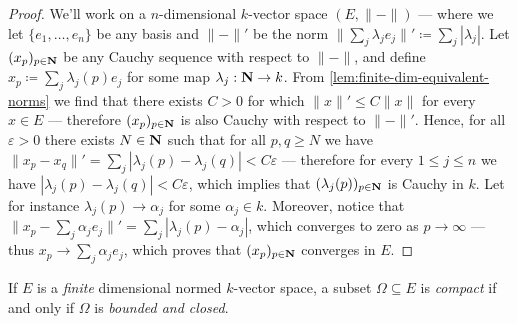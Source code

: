 \begin{proof}
    We'll work on a \(n\)-dimensional \(k\)-vector space \((E, \| - \|)\) --- where
    we let \(\{e_1, \dots, e_n\}\) be any basis and \(\| - \|'\) be the norm \(\|
    \sum_j \lambda_j e_j \|' \coloneq \sum_j |\lambda_j|\). Let \((x_p)_{p \in \mathbf{N}}\)
    be any Cauchy sequence with respect to \(\| - \|\), and define \(x_p \coloneq
    \sum_j \lambda_j(p) e_j\) for some map \(\lambda_j: \mathbf{N} \to k\). From
    \cref{lem:finite-dim-equivalent-norms} we find that there exists \(C > 0\) for
    which \(\| x \|' \leq C \| x \|\) for every \(x \in E\) --- therefore \((x_p)_{p
            \in \mathbf{N}}\) is also Cauchy with respect to \(\| - \|'\). Hence, for all
    \(\varepsilon > 0\) there exists \(N \in \mathbf{N}\) such that for all \(p, q \geq N\)
    we have \(\| x_p - x_q \|' = \sum_j |\lambda_j(p) - \lambda_j(q)| <
    C \varepsilon\) --- therefore for every \(1 \leq j \leq n\) we have
    \(|\lambda_j(p) - \lambda_j(q)| < C \varepsilon\), which implies that
    \((\lambda_j(p))_{p \in \mathbf{N}}\) is Cauchy in \(k\). Let for instance
    \(\lambda_j(p) \to \alpha_j\) for some \(\alpha_j \in k\). Moreover, notice that
    \(\| x_p - \sum_j \alpha_j e_j\|' = \sum_j |\lambda_j(p) - \alpha_j|\), which
    converges to zero as \(p \to \infty\) --- thus \(x_p \to \sum_j \alpha_j e_j\),
    which proves that \((x_p)_{p \in \mathbf{N}}\) converges in \(E\).
\end{proof}

\begin{proposition}
    \label{prop:compact-on-normed-space}
    If \(E\) is a \emph{finite} dimensional normed \(k\)-vector space, a subset
    \(\Omega \subseteq E\) is \emph{compact} if and only if \(\Omega\) is
    \emph{bounded and closed}.
\end{proposition}

